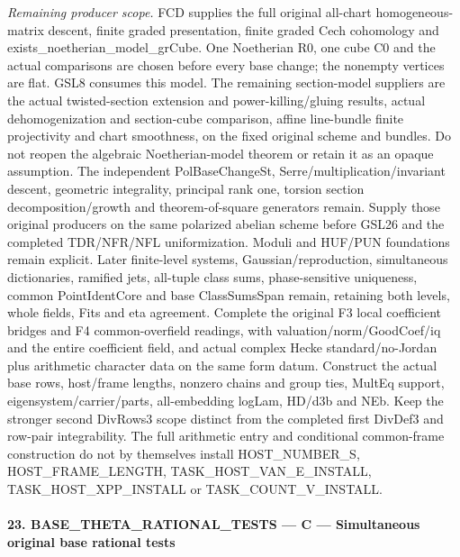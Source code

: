 \emph{Remaining producer scope.} FCD supplies the full original all-chart homogeneous-matrix descent, finite graded presentation, finite graded Cech cohomology and exists\_\allowbreak noetherian\_\allowbreak model\_\allowbreak grCube. One Noetherian R0, one cube C0 and the actual comparisons are chosen before every base change; the nonempty vertices are flat. GSL8 consumes this model. The remaining section-model suppliers are the actual twisted-section extension and power-killing/gluing results, actual dehomogenization and section-cube comparison, affine line-bundle finite projectivity and chart smoothness, on the fixed original scheme and bundles. Do not reopen the algebraic Noetherian-model theorem or retain it as an opaque assumption. The independent PolBaseChangeSt, Serre/multiplication/invariant descent, geometric integrality, principal rank one, torsion section decomposition/growth and theorem-of-square generators remain. Supply those original producers on the same polarized abelian scheme before GSL26 and the completed TDR/NFR/NFL uniformization. Moduli and HUF/PUN foundations remain explicit. Later finite-level systems, Gaussian/reproduction, simultaneous dictionaries, ramified jets, all-tuple class sums, phase-sensitive uniqueness, common PointIdentCore and base ClassSumsSpan remain, retaining both levels, whole fields, Fits and eta agreement. Complete the original F3 local coefficient bridges and F4 common-overfield readings, with valuation/norm/GoodCoef/iq and the entire coefficient field, and actual complex Hecke standard/no-Jordan plus arithmetic character data on the same form datum. Construct the actual base rows, host/frame lengths, nonzero chains and group ties, MultEq support, eigensystem/carrier/parts, all-embedding logLam, HD/d3b and NEb. Keep the stronger second DivRows3 scope distinct from the completed first DivDef3 and row-pair integrability. The full arithmetic entry and conditional common-frame construction do not by themselves install HOST\_\allowbreak NUMBER\_\allowbreak S, HOST\_\allowbreak FRAME\_\allowbreak LENGTH, TASK\_\allowbreak HOST\_\allowbreak VAN\_\allowbreak E\_\allowbreak INSTALL, TASK\_\allowbreak HOST\_\allowbreak XPP\_\allowbreak INSTALL or TASK\_\allowbreak COUNT\_\allowbreak V\_\allowbreak INSTALL.



\paragraph{23. BASE\_\allowbreak THETA\_\allowbreak RATIONAL\_\allowbreak TESTS — C — Simultaneous original base rational tests}

